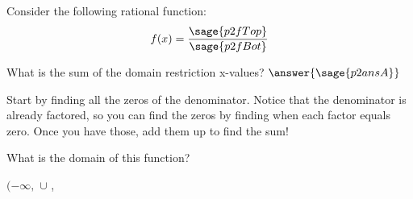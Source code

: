 \documentclass{ximera}
\begin{document}
\begin{problem}
    Consider the following rational function:
    \[
        f(x) = \frac{\sage{p2fTop}}{\sage{p2fBot}}
    \]
    
    What is the sum of the domain restriction x-values? $\answer{\sage{p2ansA}}$
        \begin{feedback}
            Start by finding all the zeros of the denominator. Notice that the denominator is already factored, so you can find the zeros by finding when each factor equals zero. Once you have those, add them up to find the sum!
        \end{feedback}
    
    \begin{problem}
        What is the domain of this function?
        
        $(-\infty,$
            \wordChoice{
                \choice{$($}
                \choice{$[$}
                \choice{$]$}
                \choice[correct]{$)$}
                }
                $\cup$
            \wordChoice{
                \choice[correct]{$($}
                \choice{$[$}
                \choice{$]$}
                \choice{$)$}
                }
            ,
\end{problem}
\end{problem}
\end{document}
